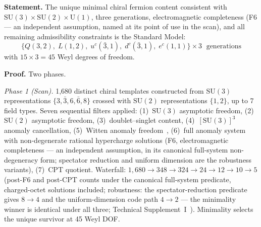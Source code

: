 \documentclass[11pt]{article}
\newcommand{\SU}{\mathrm{SU}}
\newcommand{\U}{\mathrm{U}}
\begin{document}
\begin{tcolorbox}[apfbox, title={Theorem $T_{\mathrm{field}}$ (SM Fermion Content)}]
\textbf{Statement.}  The unique minimal chiral fermion content consistent with $\SU(3) \times \SU(2) \times \U(1)$, three generations, electromagnetic completeness (F6 --- an independent assumption, named at its point of use in the scan), and all remaining admissibility constraints is the Standard Model:
\begin{equation}
\{Q(3,2),\; L(1,2),\; u^c(\bar{3},1),\; d^c(\bar{3},1),\; e^c(1,1)\} \times 3 \;\text{ generations}
\label{eq:fermion_content}
\end{equation}
with $15 \times 3 = 45$ Weyl degrees of freedom.

\smallskip\noindent\textbf{Proof.}  Two phases.

\textit{Phase 1 (Scan).}  1{,}680 distinct chiral templates constructed from $\SU(3)$ representations $\{3, \bar{3}, 6, \bar{6}, 8\}$ crossed with $\SU(2)$ representations $\{1, 2\}$, up to 7 field types.  Seven sequential filters applied: (1)~$\SU(3)$ asymptotic freedom, (2)~$\SU(2)$ asymptotic freedom, (3)~doublet--singlet content, (4)~$[\SU(3)]^3$ anomaly cancellation, (5)~Witten anomaly freedom~\cite{Witten1982}, (6)~full anomaly system with non-degenerate rational hypercharge solutions (F6, electromagnetic completeness --- an independent assumption, in its canonical full-system non-degeneracy form; spectator reduction and uniform dimension are the robustness variants), (7)~CPT quotient.  Waterfall: $1{,}680 \to 348 \to 324 \to 24 \to 12 \to 10 \to 5$ (post-F6 and post-CPT counts under the canonical full-system predicate, charged-octet solutions included; robustness: the spectator-reduction predicate gives $8 \to 4$ and the uniform-dimension code path $4 \to 2$ --- the minimality winner is identical under all three; Technical Supplement~I~\cite{BrookeP2Supplement}).  Minimality selects the unique survivor at 45 Weyl DOF.


\end{tcolorbox}
\end{document}
